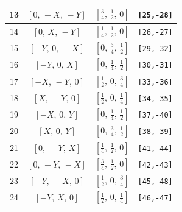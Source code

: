 \documentclass[fleqn,8pt]{jsarticle}
\begin{document}
\begin{longtable}{cccc}
13 & $\left[ 0,\, - X,\, - Y \right]$ & $\left[ \frac{3}{4},\, \frac{1}{2},\, 0 \right]$ & {\tt [25,-28]} \\ \hline
14 & $\left[ 0,\, X,\, - Y \right]$ & $\left[ \frac{1}{4},\, \frac{1}{2},\, 0 \right]$ & {\tt [26,-27]} \\ \hline
15 & $\left[ - Y,\, 0,\, - X \right]$ & $\left[ 0,\, \frac{3}{4},\, \frac{1}{2} \right]$ & {\tt [29,-32]} \\ \hline
16 & $\left[ - Y,\, 0,\, X \right]$ & $\left[ 0,\, \frac{1}{4},\, \frac{1}{2} \right]$ & {\tt [30,-31]} \\ \hline
17 & $\left[ - X,\, - Y,\, 0 \right]$ & $\left[ \frac{1}{2},\, 0,\, \frac{3}{4} \right]$ & {\tt [33,-36]} \\ \hline
18 & $\left[ X,\, - Y,\, 0 \right]$ & $\left[ \frac{1}{2},\, 0,\, \frac{1}{4} \right]$ & {\tt [34,-35]} \\ \hline
19 & $\left[ - X,\, 0,\, Y \right]$ & $\left[ 0,\, \frac{1}{4},\, \frac{1}{2} \right]$ & {\tt [37,-40]} \\ \hline
20 & $\left[ X,\, 0,\, Y \right]$ & $\left[ 0,\, \frac{3}{4},\, \frac{1}{2} \right]$ & {\tt [38,-39]} \\ \hline
21 & $\left[ 0,\, - Y,\, X \right]$ & $\left[ \frac{1}{4},\, \frac{1}{2},\, 0 \right]$ & {\tt [41,-44]} \\ \hline
22 & $\left[ 0,\, - Y,\, - X \right]$ & $\left[ \frac{3}{4},\, \frac{1}{2},\, 0 \right]$ & {\tt [42,-43]} \\ \hline
23 & $\left[ - Y,\, - X,\, 0 \right]$ & $\left[ \frac{1}{2},\, 0,\, \frac{3}{4} \right]$ & {\tt [45,-48]} \\ \hline
24 & $\left[ - Y,\, X,\, 0 \right]$ & $\left[ \frac{1}{2},\, 0,\, \frac{1}{4} \right]$ & {\tt [46,-47]} \\
\end{longtable}
\renewcommand{\arraystretch}{1.2}
\end{document}
